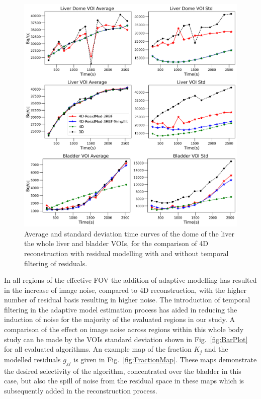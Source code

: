 \begin{figure} [!htbp]
\centering
\includegraphics[scale=0.74 ,angle=0]{3_Results/3_4_Residual/figures/TACsFilt.png}
\caption{Average and standard deviation time curves of the dome of the liver the whole liver and bladder VOIs, for the comparison of 4D reconstruction with residual modelling with and without temporal filtering of residuals.} 
\label{fig:TACsFilt}
\end{figure}

In all regions of the effective FOV the addition of adaptive modelling has resulted in the increase of image noise, compared to 4D reconstruction, with the higher number of residual basis resulting in higher noise. The introduction of temporal filtering in the adaptive model estimation process has aided in reducing the induction of noise for the majority of the evaluated regions in our study. 
A comparison of the effect on image noise across regions within this whole body study can be made by the VOIs standard deviation shown in Fig.~\ref{fig:BarPlot} for all evaluated algorithms.
An example map of the fraction $K_{j}$ and the modelled residuals $g_{jf}$ is given in Fig.~\ref{fig:FractionMap}. These maps demonstrate the desired selectivity of the algorithm, concentrated over the bladder in this case, but also the
spill of noise from the residual space in these maps which is subsequently added in the reconstruction process.

